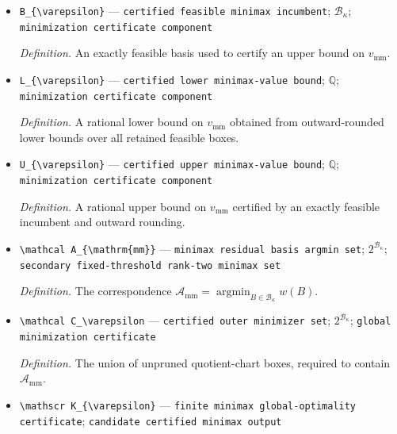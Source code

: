 \documentclass{article}
\begin{document}
\begin{itemize}
  \par\smallskip\noindent\emph{Definition.} The value \(v_{\mathrm{mm}}=\min_{B\in\mathcal B_\kappa}w(B)\).
  \item \texttt{B\_\allowbreak{}\{\textbackslash{}\allowbreak{}varepsilon\}\allowbreak{}} --- \texttt{certified feasible minimax incumbent}; \(\mathcal B_\kappa\); \texttt{minimization certificate component}
  \par\smallskip\noindent\emph{Definition.} An exactly feasible basis used to certify an upper bound on \(v_{\mathrm{mm}}\).
  \item \texttt{L\_\allowbreak{}\{\textbackslash{}\allowbreak{}varepsilon\}\allowbreak{}} --- \texttt{certified lower minimax-\allowbreak{}value bound}; \(\mathbb Q\); \texttt{minimization certificate component}
  \par\smallskip\noindent\emph{Definition.} A rational lower bound on \(v_{\mathrm{mm}}\) obtained from outward-rounded lower bounds over all retained feasible boxes.
  \item \texttt{U\_\allowbreak{}\{\textbackslash{}\allowbreak{}varepsilon\}\allowbreak{}} --- \texttt{certified upper minimax-\allowbreak{}value bound}; \(\mathbb Q\); \texttt{minimization certificate component}
  \par\smallskip\noindent\emph{Definition.} A rational upper bound on \(v_{\mathrm{mm}}\) certified by an exactly feasible incumbent and outward rounding.
  \item \texttt{\textbackslash{}\allowbreak{}mathcal A\_\allowbreak{}\{\textbackslash{}\allowbreak{}mathrm\{mm\}\allowbreak{}\}\allowbreak{}} --- \texttt{minimax residual basis argmin set}; \(2^{\mathcal B_\kappa}\); \texttt{secondary fixed-\allowbreak{}threshold rank-\allowbreak{}two minimax set}
  \par\smallskip\noindent\emph{Definition.} The correspondence \(\mathcal A_{\mathrm{mm}}=\operatorname*{argmin}_{B\in\mathcal B_\kappa}w(B)\).
  \item \texttt{\textbackslash{}\allowbreak{}mathcal C\_\allowbreak{}\textbackslash{}\allowbreak{}varepsilon} --- \texttt{certified outer minimizer set}; \(2^{\mathcal B_\kappa}\); \texttt{global minimization certificate}
  \par\smallskip\noindent\emph{Definition.} The union of unpruned quotient-chart boxes, required to contain \(\mathcal A_{\mathrm{mm}}\).
  \item \texttt{\textbackslash{}\allowbreak{}mathscr K\_\allowbreak{}\{\textbackslash{}\allowbreak{}varepsilon\}\allowbreak{}} --- \texttt{finite minimax global-\allowbreak{}optimality certificate}; \texttt{candidate certified minimax output}

\end{itemize}
\end{document}
